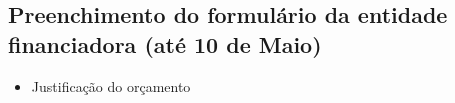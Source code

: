 \documentclass[%
	nofootinbib,
	amsmath,amssymb,
	aps,
	12pt,
	a4paper
]{article}
\begin{document}
\subsection{Preenchimento do formulário da entidade financiadora (até 10 de Maio)}
\begin{itemize}
	\item Justificação do orçamento
\end{itemize}





\nocite{*}
{}
\end{document}
